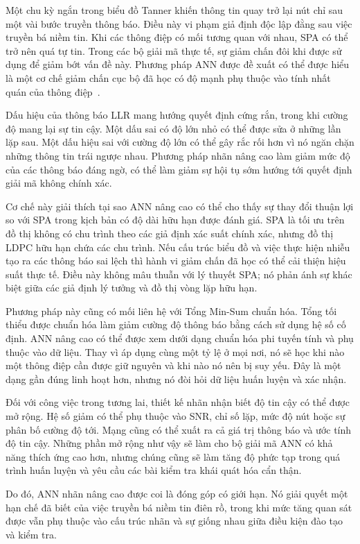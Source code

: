 Một chu kỳ ngắn trong biểu đồ Tanner khiến thông tin quay trở lại nút chỉ sau một vài bước truyền thông báo. Điều này vi phạm giả định độc lập đằng sau việc truyền bá niềm tin. Khi các thông điệp có mối tương quan với nhau, SPA có thể trở nên quá tự tin. Trong các bộ giải mã thực tế, sự giảm chấn đôi khi được sử dụng để giảm bớt vấn đề này. Phương pháp ANN được đề xuất có thể được hiểu là một cơ chế giảm chấn cục bộ đã học có độ mạnh phụ thuộc vào tính nhất quán của thông điệp~.

Dấu hiệu của thông báo LLR mang hướng quyết định cứng rắn, trong khi cường độ mang lại sự tin cậy. Một dấu sai có độ lớn nhỏ có thể được sửa ở những lần lặp sau. Một dấu hiệu sai với cường độ lớn có thể gây rắc rối hơn vì nó ngăn chặn những thông tin trái ngược nhau. Phương pháp nhãn nâng cao làm giảm mức độ của các thông báo đáng ngờ, có thể làm giảm sự hội tụ sớm hướng tới quyết định giải mã không chính xác.

Cơ chế này giải thích tại sao ANN nâng cao có thể cho thấy sự thay đổi thuận lợi so với SPA trong kịch bản có độ dài hữu hạn được đánh giá. SPA là tối ưu trên đồ thị không có chu trình theo các giả định xác suất chính xác, nhưng đồ thị LDPC hữu hạn chứa các chu trình. Nếu cấu trúc biểu đồ và việc thực hiện nhiễu tạo ra các thông báo sai lệch thì hành vi giảm chấn đã học có thể cải thiện hiệu suất thực tế. Điều này không mâu thuẫn với lý thuyết SPA; nó phản ánh sự khác biệt giữa các giả định lý tưởng và đồ thị vòng lặp hữu hạn.

Phương pháp này cũng có mối liên hệ với Tổng Min-Sum chuẩn hóa. Tổng tối thiểu được chuẩn hóa làm giảm cường độ thông báo bằng cách sử dụng hệ số cố định. ANN nâng cao có thể được xem dưới dạng chuẩn hóa phi tuyến tính và phụ thuộc vào dữ liệu. Thay vì áp dụng cùng một tỷ lệ ở mọi nơi, nó sẽ học khi nào một thông điệp cần được giữ nguyên và khi nào nó nên bị suy yếu. Đây là một dạng gần đúng linh hoạt hơn, nhưng nó đòi hỏi dữ liệu huấn luyện và xác nhận.

Đối với công việc trong tương lai, thiết kế nhãn nhận biết độ tin cậy có thể được mở rộng. Hệ số giảm có thể phụ thuộc vào SNR, chỉ số lặp, mức độ nút hoặc sự phân bố cường độ tới. Mạng cũng có thể xuất ra cả giá trị thông báo và ước tính độ tin cậy. Những phần mở rộng như vậy sẽ làm cho bộ giải mã ANN có khả năng thích ứng cao hơn, nhưng chúng cũng sẽ làm tăng độ phức tạp trong quá trình huấn luyện và yêu cầu các bài kiểm tra khái quát hóa cẩn thận.

Do đó, ANN nhãn nâng cao được coi là đóng góp có giới hạn. Nó giải quyết một hạn chế đã biết của việc truyền bá niềm tin điên rồ, trong khi mức tăng quan sát được vẫn phụ thuộc vào cấu trúc nhãn và sự giống nhau giữa điều kiện đào tạo và kiểm tra.

